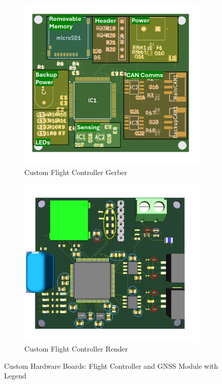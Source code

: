 \begin{figure}[htbp]
  
  \begin{subfigure}[b]{0.48\textwidth}
    \includegraphics[width=\textwidth]{figs/Thomas/Custom Hardware/FC gerber.png}
    \caption{Custom Flight Controller Gerber}
    \label{fig:fc_gerber}
  \end{subfigure}
  \hfill
  \begin{subfigure}[b]{0.48\textwidth}
    \includegraphics[width=\textwidth]{figs/Thomas/Custom Hardware/FC render.png}
    \caption{Custom Flight Controller Render}
    \label{fig:fc_render}
  \end{subfigure}

  \vspace{1em} %
  \caption{Custom Hardware Boards: Flight Controller and GNSS Module with Legend}
  \label{fig:custom_hardware_overview}
\end{figure}

